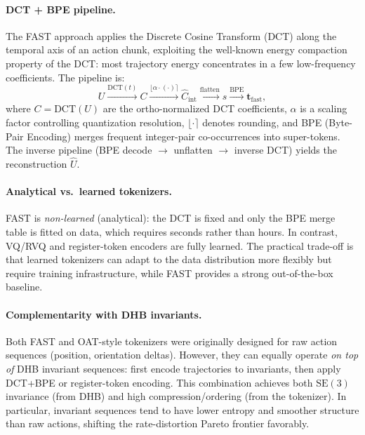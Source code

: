 \documentclass[11pt]{article}
\begin{document}
\paragraph{DCT + BPE pipeline.}
The FAST approach applies the Discrete Cosine Transform (DCT) along the temporal axis of an action chunk, exploiting the well-known energy compaction property of the DCT: most trajectory energy concentrates in a few low-frequency coefficients. The pipeline is:
\begin{equation}
  U \xrightarrow{\mathrm{DCT}(t)} C \xrightarrow{\lfloor \alpha \cdot (\cdot) \rceil} \hat C_{\mathrm{int}} \xrightarrow{\mathrm{flatten}} s \xrightarrow{\mathrm{BPE}} \bm{t}_{\mathrm{fast}},
\end{equation}
where $C = \mathrm{DCT}(U)$ are the ortho-normalized DCT coefficients, $\alpha$ is a scaling factor controlling quantization resolution, $\lfloor\cdot\rceil$ denotes rounding, and BPE (Byte-Pair Encoding) merges frequent integer-pair co-occurrences into super-tokens. The inverse pipeline (BPE decode $\to$ unflatten $\to$ inverse DCT) yields the reconstruction $\hat U$.

\paragraph{Analytical vs.\ learned tokenizers.}
FAST is \emph{non-learned} (analytical): the DCT is fixed and only the BPE merge table is fitted on data, which requires seconds rather than hours. In contrast, VQ/RVQ and register-token encoders are fully learned. The practical trade-off is that learned tokenizers can adapt to the data distribution more flexibly but require training infrastructure, while FAST provides a strong out-of-the-box baseline.

\paragraph{Complementarity with DHB invariants.}
Both FAST and OAT-style tokenizers were originally designed for raw action sequences (position, orientation deltas). However, they can equally operate \emph{on top of} DHB invariant sequences: first encode trajectories to invariants, then apply DCT+BPE or register-token encoding. This combination achieves both $\mathrm{SE}(3)$ invariance (from DHB) and high compression/ordering (from the tokenizer). In particular, invariant sequences tend to have lower entropy and smoother structure than raw actions, shifting the rate-distortion Pareto frontier favorably.
\end{document}
